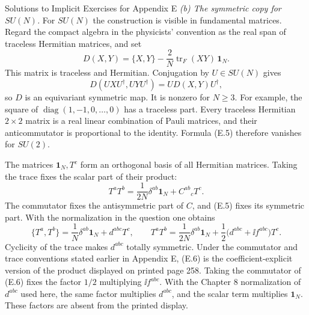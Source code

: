 \begin{bankssolutions}{Solutions to Implicit Exercises for Appendix E}
\medskip\noindent
\textit{(b) The symmetric copy for $SU(N)$.}
For $SU(N)$ the construction is visible in fundamental matrices.  Regard
the compact algebra in the physicists' convention as the real span of
traceless Hermitian matrices, and set
\[
  D(X,Y)=\{X,Y\}-\frac{2}{N}\operatorname{tr}_F(XY)\,\mathbf1_N.
  \tag{E.5}
\]
This matrix is traceless and Hermitian.  Conjugation by $U\in SU(N)$ gives
\[
  D(UXU^\dagger,UYU^\dagger)=U D(X,Y)U^\dagger,
\]
so $D$ is an equivariant symmetric map.  It is nonzero for $N\geq3$.  For
example, the square of
$\operatorname{diag}(1,-1,0,\ldots,0)$ has a traceless part.  Every traceless
Hermitian $2\times2$ matrix is a real linear combination of Pauli matrices,
and their anticommutator is proportional to the identity.  Formula (E.5)
therefore vanishes for $SU(2)$.

The matrices $\mathbf1_N,T^c$ form an orthogonal basis of all Hermitian
matrices.  Taking the trace fixes the scalar part of their product:
\[
  T^aT^b=\frac{1}{2N}\delta^{ab}\mathbf1_N+C^{ab}{}_cT^c.
\]
The commutator fixes the antisymmetric part of $C$, and (E.5) fixes its
symmetric part.  With the normalization in the question one obtains
\[
  \{T^a,T^b\}=\frac1N\delta^{ab}\mathbf1_N+d^{abc}T^c,
  \qquad
  T^aT^b=\frac{1}{2N}\delta^{ab}\mathbf1_N
  +\frac12\bigl(d^{abc}+\ii f^{abc}\bigr)T^c.
  \tag{E.6}
\]
Cyclicity of the trace makes $d^{abc}$ totally symmetric.  Under the
commutator and trace conventions stated earlier in Appendix E, (E.6) is the
coefficient-explicit version of the product displayed on printed page 258.
Taking the commutator of (E.6) fixes the factor $1/2$ multiplying
$\ii f^{abc}$.  With the Chapter 8 normalization of $d^{abc}$ used here, the
same factor multiplies $d^{abc}$, and the scalar term multiplies
$\mathbf1_N$.  These factors are absent from the printed display.


\end{bankssolutions}
